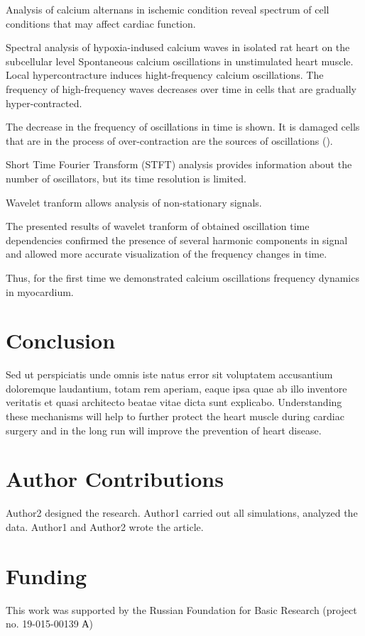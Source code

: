 \documentclass{biophys-new}
\begin{document}
Analysis of calcium alternans in ischemic condition reveal spectrum of cell conditions that may affect cardiac function.

Spectral analysis of hypoxia-indused calcium waves in isolated rat heart on the subcellular level
Spontaneous calcium oscillations in unstimulated heart muscle.
Local hypercontracture induces hight-frequency calcium oscillations.
The frequency of high-frequency waves decreases over time in cells that are gradually hyper-contracted.

The decrease in the frequency of oscillations in time is shown.
It is damaged cells that are in the process of over-contraction
are the sources of oscillations (\cite{sato2014depolarization}).

Short Time Fourier Transform (STFT) analysis provides information about the number of oscillators, but its time resolution is limited.

Wavelet tranform allows analysis of non-stationary signals.

The presented results of wavelet tranform of obtained oscillation time dependencies confirmed the presence of several harmonic components in signal
and allowed more accurate visualization of the frequency changes in time.

Thus, for the first time we demonstrated calcium oscillations frequency dynamics in myocardium.

\section*{Conclusion}
Sed ut perspiciatis unde omnis iste natus error sit voluptatem accusantium doloremque laudantium, totam rem aperiam, eaque ipsa quae ab illo inventore veritatis et quasi architecto beatae vitae dicta sunt explicabo.
Understanding these mechanisms will help to further protect the heart muscle during cardiac surgery and in the long run will improve the prevention of heart disease.

\section*{Author Contributions}
Author2 designed the research. Author1 carried out all simulations, analyzed the data. Author1 and Author2 wrote the article.

\section*{Funding}
This work was supported by the Russian Foundation for Basic Research (project no. 19-015-00139 А)
\end{document}
